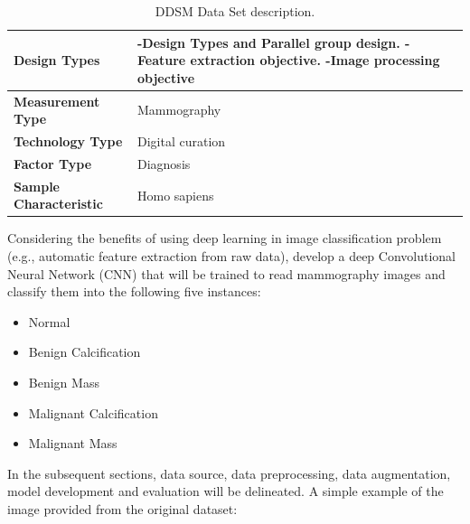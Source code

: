 \documentclass{book}
\begin{document}
        
        \begin{table}
            \begin{tabular}{m{5cm}m{8cm}}
                \midrule
                \textbf{Design Types} & -Design Types and Parallel group design.  -Feature extraction objective.  -Image processing objective \\
                \midrule
                \textbf{Measurement Type} & Mammography \\ 
                \midrule
                \textbf{Technology Type} & Digital curation \\ 
                \midrule
                \textbf{Factor Type} & Diagnosis \\
                \midrule
                \textbf{Sample Characteristic} & Homo sapiens\\
                \midrule
            \end{tabular}
            \caption{\label{tab:DDSM}DDSM Data Set description.}
        \end{table}

        Considering the benefits of using deep learning in image classification problem (e.g., automatic feature extraction from raw data), develop a deep Convolutional Neural Network (CNN) that will be trained to read mammography images and classify them into the following five instances:

        \begin{itemize}
            \item Normal
            \item Benign Calcification
            \item Benign Mass
            \item Malignant Calcification
            \item Malignant Mass
        \end{itemize}

        In the subsequent sections, data source, data preprocessing, data augmentation, model development and evaluation will be delineated. A simple example of the image provided from the original dataset:
\end{document}
